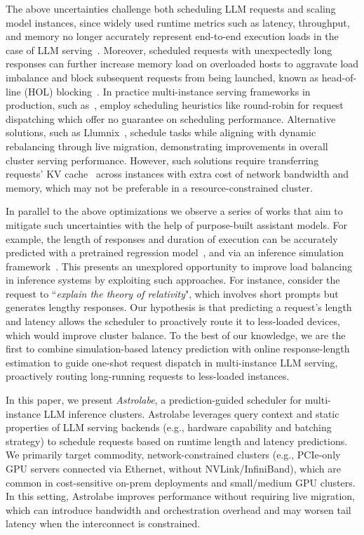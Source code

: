 \documentclass[sigconf, review, anonymous]{acmart}
\begin{document}
The above uncertainties challenge both scheduling LLM requests and scaling model instances, since widely used runtime metrics such as latency, throughput, and memory no longer accurately represent end-to-end execution loads in the case of LLM serving~\cite{sun2024llumnix}. Moreover, scheduled requests with unexpectedly long responses can further increase memory load on overloaded hosts to aggravate load imbalance and block subsequent requests from being launched, known as head-of-line (HOL) blocking~\cite{QLMQueue, ELIS}. In practice multi-instance serving frameworks in production, such as~\cite{nvidiaTritonInference, deepspeed}, employ scheduling heuristics like round-robin for request dispatching which offer no guarantee on scheduling performance.  Alternative solutions, such as Llumnix~\cite{sun2024llumnix}, schedule tasks while aligning with dynamic rebalancing through live migration, demonstrating improvements in overall cluster serving performance. However, such solutions require transferring requests' KV cache~\cite{kang2024gearefficientkvcache} across instances with extra cost of network bandwidth and memory, which may not be preferable in a resource-constrained cluster.

In parallel to the above optimizations we observe a series of works that aim to mitigate such uncertainties with the help of purpose-built assistant models.
For example, the length of responses and duration of execution can be accurately predicted with a pretrained regression model~\cite{length_estimation}, and via an inference simulation framework~\cite{vidur}.  This presents an unexplored opportunity to improve load balancing in inference systems by exploiting such approaches. For instance, consider the request to ``\emph{explain the theory of relativity}", which involves short prompts but generates lengthy responses. Our hypothesis is that predicting a request's length and latency allows the scheduler to proactively route it to less-loaded devices, which would improve cluster balance. To the best of our knowledge, we are the first to combine simulation-based latency prediction with online response-length estimation to guide one-shot request dispatch in multi-instance LLM serving, proactively routing long-running requests to less-loaded instances. 

In this paper, we present \emph{Astrolabe}, a prediction-guided scheduler for multi-instance LLM inference clusters. Astrolabe leverages query context and static properties of LLM serving backends (e.g., hardware capability and batching strategy) to schedule requests based on runtime length and latency predictions. We primarily target commodity, network-constrained clusters (e.g., PCIe-only GPU servers connected via Ethernet, without NVLink/InfiniBand), which are common in cost-sensitive on-prem deployments and small/medium GPU clusters.  In this setting, Astrolabe improves performance without requiring live migration, which can introduce bandwidth and orchestration overhead and may worsen tail latency when the interconnect is constrained.
\end{document}
